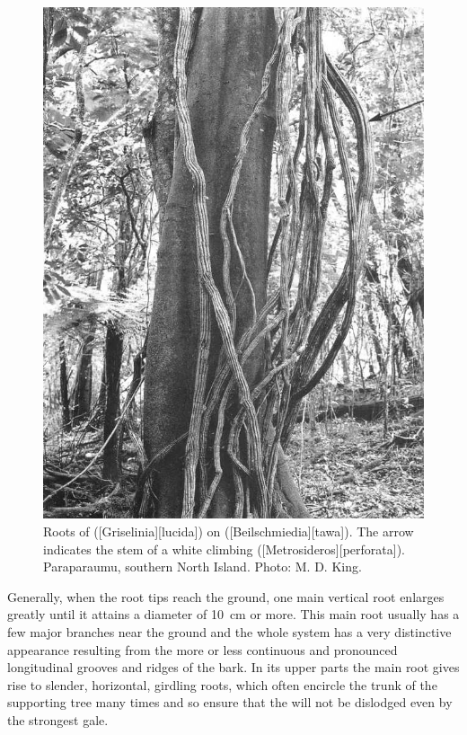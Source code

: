 \begin{figure}[htb]
\begin{minipage}[t]{0.494\textwidth}
    	\includegraphics[width=\textwidth]{graphics/figure47puka-roots.jpg}
    	\caption[Roots of puka on tawa]{Roots of  ([Griselinia][lucida]) on  ([Beilschmiedia][tawa]).
    	The arrow indicates the stem of a white climbing  ([Metrosideros][perforata]).
    	Paraparaumu, southern North Island.
    	Photo: M. D. King.}%
    	\label{fig:47puka-roots}
	\end{minipage}
\end{figure}

Generally, when the root tips reach the ground, one main vertical root enlarges greatly until it attains a diameter of \SI{10}{\centi\metre} or more.
This main root usually has a few major branches near the ground and the whole system has a very distinctive appearance resulting from the more or less continuous and pronounced longitudinal grooves and ridges of the bark.
In its upper parts the main root gives rise to slender, horizontal, girdling roots, which often encircle the trunk of the supporting tree many times and so ensure that the  will not be dislodged even by the strongest gale.

